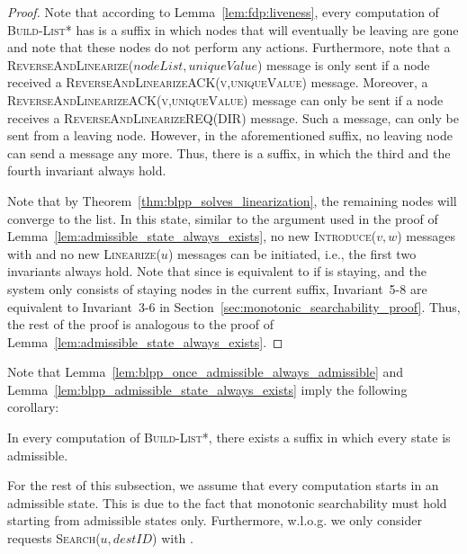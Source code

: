 \documentclass[a4paper,USenglish]{lipics}
\newcommand{\blpp}{\textsc{Build-List*}\xspace}
\newcommand{\linearize}[1]{\textsc{Linearize(\ensuremath{#1})}\xspace}
\newcommand{\introduce}[1]{\textsc{Introduce(\ensuremath{#1})}\xspace}
\newcommand{\search}[1]{\textsc{Search(\ensuremath{#1})}\xspace}
\newcommand{\revandlin}[1]{\textsc{ReverseAndLinearize(\ensuremath{#1})}\xspace} \newcommand{\revandlinREQ}[1]{\textsc{ReverseAndLinearizeREQ(#1)}\xspace}
\newcommand{\revandlinACK}[1]{\textsc{ReverseAndLinearizeACK(#1)}\xspace}
\begin{document}
\begin{proof}
 Note that according to Lemma~\ref{lem:fdp:liveness}, every computation of \blpp has is a suffix in which nodes that will eventually be leaving are gone and note that these nodes do not perform any actions.
 Furthermore, note that a \revandlin{nodeList,uniqueValue} message is only sent if a node received a \revandlinACK{v,uniqueValue} message.
 Moreover, a \revandlinACK{v,uniqueValue} message can only be sent if a node receives a \revandlinREQ{DIR} message.
 Such a message, can only be sent from a leaving node.
 However, in the aforementioned suffix, no leaving node can send a message any more. 
 Thus, there is a suffix, in which the third and the fourth invariant always hold.
 
 Note that by Theorem~\ref{thm:blpp_solves_linearization}, the remaining nodes will converge to the list.
 In this state, similar to the argument used in the proof of Lemma~\ref{lem:admissible_state_always_exists}, no new \introduce{v,w} messages with  and no new \linearize{u} messages can be initiated, i.e., the first two invariants always hold.
 Note that since  is equivalent to  if  is staying, and the system only consists of staying nodes in the current suffix, Invariant~5-8 are equivalent to Invariant~3-6 in Section~\ref{sec:monotonic_searchability_proof}.
 Thus, the rest of the proof is analogous to the proof of Lemma~\ref{lem:admissible_state_always_exists}.
\end{proof}
Note that Lemma~\ref{lem:blpp_once_admissible_always_admissible} and Lemma~\ref{lem:blpp_admissible_state_always_exists} imply the following corollary:
\begin{corollary}
    In every computation of \blpp, there exists a suffix in which every state is admissible. 
\end{corollary}
For the rest of this subsection, we assume that every computation starts in an admissible state.
This is due to the fact that monotonic searchability must hold starting from admissible states only.
Furthermore, w.l.o.g. we only consider requests \search{u,destID} with .
\end{document}
